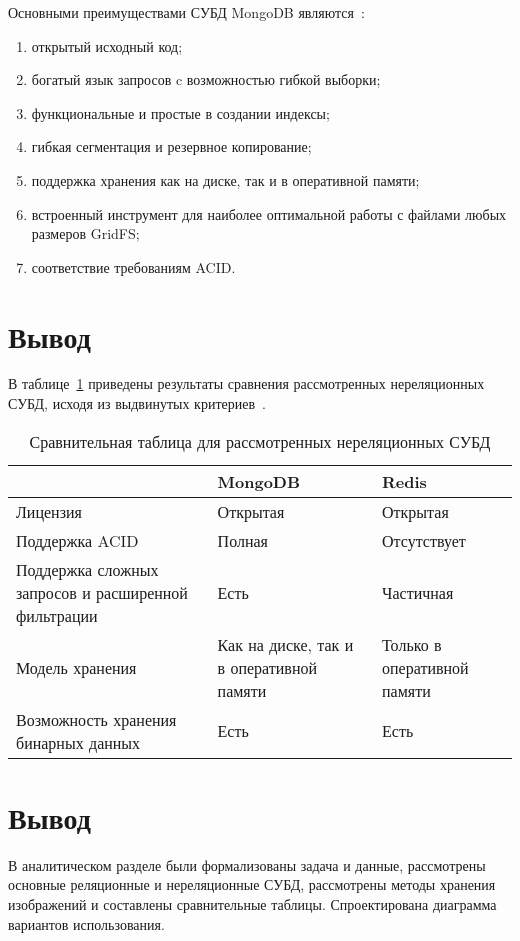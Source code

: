 Основными преимуществами СУБД MongoDB являются~\cite{cmpNosql1}:
\begin{enumerate}
	\item открытый исходный код;
	\item богатый язык запросов c возможностью гибкой выборки;
	\item функциональные и простые в создании индексы;
	\item гибкая сегментация и резервное копирование;
	\item поддержка хранения как на диске, так и в оперативной памяти;
	\item встроенный инструмент для наиболее оптимальной работы с файлами любых размеров GridFS;
	\item соответствие требованиям ACID.
\end{enumerate}

\section*{Вывод}

В таблице~\ref{table:compareNoSQLDBs} приведены результаты сравнения рассмотренных нереляционных СУБД, исходя из выдвинутых критериев~\cite{cmpNosql1}.
\begin{table}[h!]
	\begin{center}
		\caption{\label{table:compareNoSQLDBs} Сравнительная таблица для рассмотренных нереляционных СУБД}
		\begin{tabularx}{\textwidth}{|X|X|X|}
			\hline
			~ & MongoDB & Redis \\ \hline
			Лицензия & Открытая & Открытая \\ \hline
			Поддержка ACID & Полная & Отсутствует \\ \hline
			Поддержка сложных запросов и расширенной фильтрации & Есть & Частичная \\ \hline
			Модель хранения & Как на диске, так и в оперативной памяти & Только в оперативной памяти \\ \hline
			Возможность хранения бинарных данных & Есть & Есть \\ \hline
		\end{tabularx}
	\end{center}
\end{table}

\section*{Вывод}

В аналитическом разделе были формализованы задача и данные, рассмотрены основные реляционные и нереляционные СУБД, рассмотрены методы хранения изображений и составлены сравнительные таблицы.
Спроектирована диаграмма вариантов использования.
